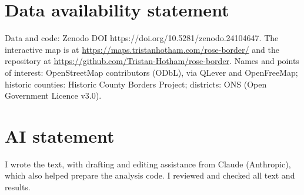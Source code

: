 \documentclass[11pt,a4paper]{article}
\begin{document}
\section*{Data availability statement}
Data and code: Zenodo DOI https://doi.org/10.5281/zenodo.24104647. The interactive map is at \url{https://maps.tristanhotham.com/rose-border/} and the repository at \url{https://github.com/Tristan-Hotham/rose-border}. Names and points of interest: OpenStreetMap contributors (ODbL), via QLever and OpenFreeMap; historic counties: Historic County Borders Project; districts: ONS (Open Government Licence v3.0).

\section*{AI statement}
I wrote the text, with drafting and editing assistance from Claude (Anthropic), which also helped prepare the analysis code. I reviewed and checked all text and results.
\end{document}
